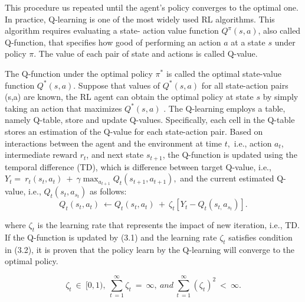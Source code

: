 \documentclass[letterpaper%
, oneside%
, 12pt%
,thesepararticles%
, english%
,creativecommons,hyperref, withAlgo2e%
]{thETS}
\begin{document}
\begin{enumerate}
\begin{enumerate}
{This procedure us repeated until the agent's policy converges to the optimal one. In practice, Q-learning is one of the most widely used RL algorithms. This algorithm requires evaluating a state- action value function $\displaystyle Q^{\pi }( s,a)$, also called Q-function, that specifies how good of performing an action $\displaystyle a$ at a state $\displaystyle s$ under policy $\displaystyle \pi $. The value of each pair of state and actions is called Q-value. 

The Q-function under the optimal policy $\displaystyle \pi ^{*}$ is called the optimal state-value function $\displaystyle Q^{*}( s,a)$. Suppose that values of $\displaystyle Q^{*}( s,a)$ for all state-action pairs (s,a) are known, the RL agent can obtain the optimal policy at state $\displaystyle s$ by simply taking an action that maximizes $\displaystyle Q^{*}( s,a)$ \cite{Sutton+Barto:1998}. The Q-learning employs a table, namely Q-table, store and update Q-values. Specifically, each cell in the Q-table stores an estimation of the Q-value for each state-action pair. Based on interactions between the agent and the environment at time $\displaystyle t,$ i.e., action $\displaystyle a_{t}$, intermediate reward $\displaystyle r_{t}$, and next state $\displaystyle s_{t+1}$, the Q-function is updated using the temporal difference (TD), which is difference between target Q-value, i.e., $\displaystyle Y_{t} =\ r_{t}( s_{t} ,a_{t}) \ +\ \gamma \max_{a_{t+1}} Q_{t}( s_{t+1} ,a_{t+1}) ,$ and the current estimated Q-value, i.e., $\displaystyle Q_{t}( s_{t} ,a_{s_{t}})$ as follows:
\begin{equation}
Q_{t}( s_{t} ,a_{t}) \ \leftarrow Q_{t}( s_{t} ,a_{t}) \ +\ \zeta _{t}[ Y_{t} -Q_{t}( s_{t,} a_{s_{t}})] .
\end{equation}

where $\displaystyle \zeta _{t}$ is the learning rate that represents the impact of new iteration, i.e., TD. If the Q-function is updated by (3.1) and the learning rate $\displaystyle \zeta _{t}$ satisfies condition in (3.2), it is proven that the policy learn by the Q-learning will converge to the optimal policy. \cite{zhu2021transfer}

\begin{equation}
\zeta _{t} \ \in \ [ 0,1) ,\ \sum ^{\infty }_{t\ =1} \zeta _{t} \ =\ \infty ,\ and\ \sum ^{\infty }_{t\ =1}( \zeta _{t})^{2} \ < \ \infty .
\end{equation}

}
\end{enumerate}
\end{enumerate}
\end{document}
